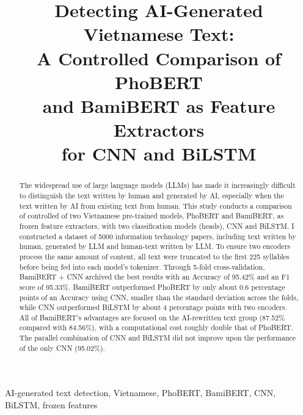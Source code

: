 \documentclass[conference,a4paper]{IEEEtran}
\begin{document}
\title{Detecting AI-Generated Vietnamese Text:\\
A Controlled Comparison of PhoBERT\\ and BamiBERT as Feature Extractors\\ for CNN and BiLSTM}

\author{
}

\maketitle

\begin{abstract}
The widespread use of large language models (LLMs) has made it increasingly difficult to distinguish the text written by human and generated by AI, especially when the text written by AI from existing text from human. This study conducts a comparison of controlled of two Vietnamese pre-trained models, PhoBERT and BamiBERT, as frozen feature extractors, with two classification models (heads), CNN and BiLSTM. I constructed a dataset of 5000 information technology papers, including text written by human, generated by LLM and human-text written by LLM. To ensure two encoders process the same amount of content, all text were truncated to the first 225 syllables before being fed into each model's tokenizer. Through 5-fold cross-validation, BamiBERT + CNN archived the best results with an Accuracy of 95.42\% and an F1 score of 95.33\%. BamiBERT outperformed PhoBERT by only about 0.6 percentage points of an Accuracy using CNN, smaller than the standard deviation across the folds, while CNN outperformed BiLSTM by about 4 percentage points with two encoders. All of BamiBERT's advantages are focused on the AI-rewritten text group (87.52\% compared with 84.56\%), with a computational cost roughly double that of PhoBERT. The parallel combination of CNN and BiLSTM did not improve upon the performance of the only CNN (95.02\%).      
\end{abstract}

\begin{IEEEkeywords}
AI-generated text detection, Vietnamese, PhoBERT, BamiBERT, CNN, BiLSTM, frozen features
\end{IEEEkeywords}
\end{document}
